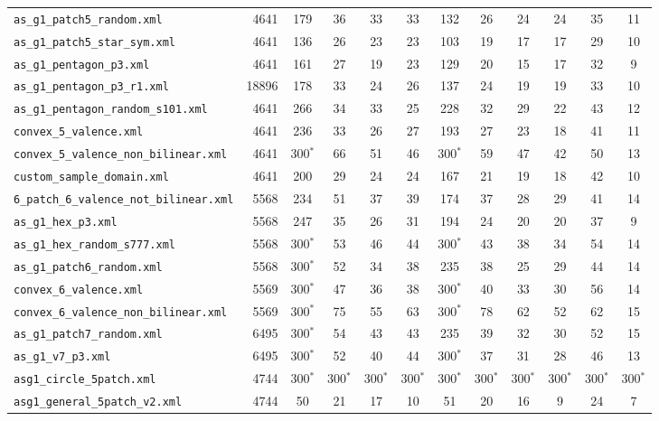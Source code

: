 \documentclass[10pt,a4paper]{article}
\begin{document}
{\begin{longtable}{@{}lrcccccccccc@{}}
\texttt{as\_g1\_patch5\_random.xml} & 4641 & 179 & 36 & 33 & 33 & 132 & 26 & 24 & 24 & 35 & 11 \\
\texttt{as\_g1\_patch5\_star\_sym.xml} & 4641 & 136 & 26 & 23 & 23 & 103 & 19 & 17 & 17 & 29 & 10 \\
\texttt{as\_g1\_pentagon\_p3.xml} & 4641 & 161 & 27 & 19 & 23 & 129 & 20 & 15 & 17 & 32 & 9 \\
\texttt{as\_g1\_pentagon\_p3\_r1.xml} & 18896 & 178 & 33 & 24 & 26 & 137 & 24 & 19 & 19 & 33 & 10 \\
\texttt{as\_g1\_pentagon\_random\_s101.xml} & 4641 & 266 & 34 & 33 & 25 & 228 & 32 & 29 & 22 & 43 & 12 \\
\texttt{convex\_5\_valence.xml} & 4641 & 236 & 33 & 26 & 27 & 193 & 27 & 23 & 18 & 41 & 11 \\
\texttt{convex\_5\_valence\_non\_bilinear.xml} & 4641 & 300$^*$ & 66 & 51 & 46 & 300$^*$ & 59 & 47 & 42 & 50 & 13 \\
\texttt{custom\_sample\_domain.xml} & 4641 & 200 & 29 & 24 & 24 & 167 & 21 & 19 & 18 & 42 & 10 \\
\texttt{6\_patch\_6\_valence\_not\_bilinear.xml} & 5568 & 234 & 51 & 37 & 39 & 174 & 37 & 28 & 29 & 41 & 14 \\
\texttt{as\_g1\_hex\_p3.xml} & 5568 & 247 & 35 & 26 & 31 & 194 & 24 & 20 & 20 & 37 & 9 \\
\texttt{as\_g1\_hex\_random\_s777.xml} & 5568 & 300$^*$ & 53 & 46 & 44 & 300$^*$ & 43 & 38 & 34 & 54 & 14 \\
\texttt{as\_g1\_patch6\_random.xml} & 5568 & 300$^*$ & 52 & 34 & 38 & 235 & 38 & 25 & 29 & 44 & 14 \\
\texttt{convex\_6\_valence.xml} & 5569 & 300$^*$ & 47 & 36 & 38 & 300$^*$ & 40 & 33 & 30 & 56 & 14 \\
\texttt{convex\_6\_valence\_non\_bilinear.xml} & 5569 & 300$^*$ & 75 & 55 & 63 & 300$^*$ & 78 & 62 & 52 & 62 & 15 \\
\texttt{as\_g1\_patch7\_random.xml} & 6495 & 300$^*$ & 54 & 43 & 43 & 235 & 39 & 32 & 30 & 52 & 15 \\
\texttt{as\_g1\_v7\_p3.xml} & 6495 & 300$^*$ & 52 & 40 & 44 & 300$^*$ & 37 & 31 & 28 & 46 & 13 \\
\texttt{asg1\_circle\_5patch.xml} & 4744 & 300$^*$ & 300$^*$ & 300$^*$ & 300$^*$ & 300$^*$ & 300$^*$ & 300$^*$ & 300$^*$ & 300$^*$ & 300$^*$ \\
\texttt{asg1\_general\_5patch\_v2.xml} & 4744 & 50 & 21 & 17 & 10 & 51 & 20 & 16 & 9 & 24 & 7 \\

\end{longtable}}
\end{document}
